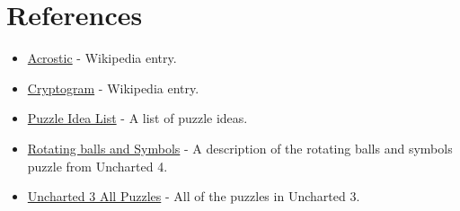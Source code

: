 \documentclass[11pt]{article}
\begin{document}
\section{References}
\label{sec:org8c8de9f}
\begin{itemize}
\item \href{https://en.wikipedia.org/wiki/Acrostic\_(puzzle)}{Acrostic} - Wikipedia entry.
\item \href{https://en.wikipedia.org/wiki/Cryptogram}{Cryptogram} - Wikipedia entry.
\item \href{http://www.bloodandbones.com/ph12sim/types.htm}{Puzzle Idea List} - A list of puzzle ideas.
\item \href{http://www.accelerated-ideas.com/news/uncharted-4-chapter-1-2-puzzle-solution-rotating-balls.aspx}{Rotating balls and Symbols} - A description of the rotating balls and symbols puzzle from Uncharted 4.
\item \href{http://www.gameshampoo.com/magazine/articles/24/uncharted-3-all-puzzle-solutions.html}{Uncharted 3 All Puzzles} - All of the puzzles in Uncharted 3.
\end{itemize}
\end{document}
